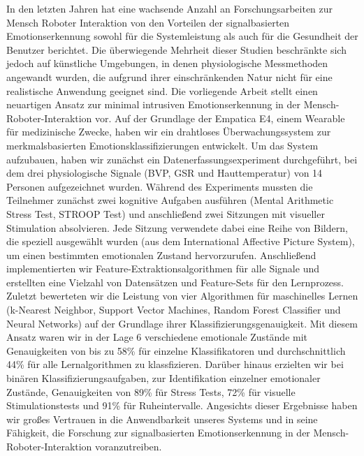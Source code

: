 

In den letzten Jahren hat eine wachsende Anzahl an Forschungsarbeiten zur Mensch Roboter Interaktion von den Vorteilen der signalbasierten Emotionserkennung sowohl für die Systemleistung als auch für die Gesundheit der Benutzer berichtet. Die überwiegende Mehrheit dieser Studien beschränkte sich jedoch auf künstliche Umgebungen, in denen physiologische Messmethoden angewandt wurden, die aufgrund ihrer einschränkenden Natur nicht für eine realistische Anwendung geeignet sind.
Die vorliegende Arbeit stellt einen neuartigen Ansatz zur minimal intrusiven Emotionserkennung in der Mensch-Roboter-Interaktion vor. Auf der Grundlage der  Empatica E4, einem Wearable für medizinische Zwecke, haben wir ein drahtloses Überwachungssystem zur merkmalsbasierten Emotionsklassifizierungen entwickelt.
Um das System aufzubauen, haben wir zunächst ein Datenerfassungsexperiment durchgeführt, bei dem drei physiologische Signale (BVP, GSR und Hauttemperatur) von 14 Personen aufgezeichnet wurden. Während des Experiments mussten die Teilnehmer zunächst zwei kognitive Aufgaben ausführen (Mental Arithmetic Stress Test, STROOP Test) und anschließend zwei Sitzungen mit visueller Stimulation absolvieren. Jede Sitzung verwendete dabei eine Reihe von Bildern, die speziell ausgewählt wurden (aus dem International Affective Picture System), um einen bestimmten emotionalen Zustand hervorzurufen.
Anschließend implementierten wir Feature-Extraktionsalgorithmen für alle Signale und erstellten eine Vielzahl von Datensätzen und Feature-Sets für den Lernprozess.
Zuletzt bewerteten wir die Leistung von vier Algorithmen für maschinelles Lernen (k-Nearest Neighbor, Support Vector Machines, Random Forest Classifier und Neural Networks) auf der Grundlage ihrer Klassifizierungsgenauigkeit.
Mit diesem Ansatz waren wir in der Lage 6 verschiedene emotionale Zustände mit Genauigkeiten von bis zu 58\% für einzelne Klassifikatoren und durchschnittlich 44\% für alle Lernalgorithmen zu klassfizieren.
Darüber hinaus erzielten wir bei binären Klassifizierungsaufgaben, zur Identifikation einzelner emotionaler Zustände, Genauigkeiten von 89\% für Stress Tests, 72\% für visuelle Stimulationstests und 91\% für Ruheintervalle.
Angesichts dieser Ergebnisse haben wir großes Vertrauen in die Anwendbarkeit unseres Systems und in seine Fähigkeit, die Forschung zur signalbasierten Emotionserkennung in der Mensch-Roboter-Interaktion voranzutreiben.